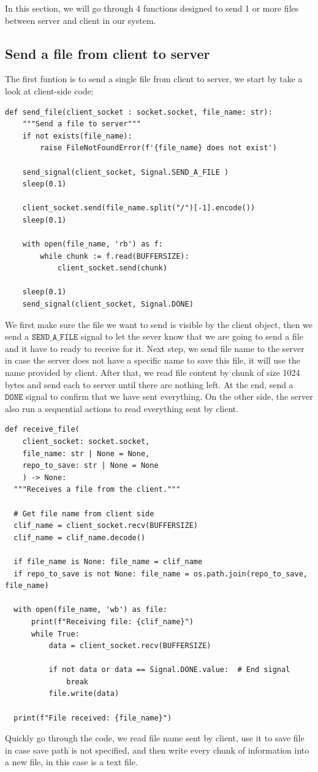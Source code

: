 \documentclass{article}
\begin{document}
In this section, we will go through 4 functions designed to send 1 or more files between server and client in our system. 

\subsection*{Send a file from client to server}
The first funtion is to send a single file from client to server, we start by take a look at client-side code: \pagebreak
\begin{lstlisting}[frame=single]
  def send_file(client_socket : socket.socket, file_name: str):
    """Send a file to server"""
    if not exists(file_name):
        raise FileNotFoundError(f'{file_name} does not exist')
    
    send_signal(client_socket, Signal.SEND_A_FILE )
    sleep(0.1)
    
    client_socket.send(file_name.split("/")[-1].encode())
    sleep(0.1)

    with open(file_name, 'rb') as f:
        while chunk := f.read(BUFFERSIZE):
            client_socket.send(chunk)

    sleep(0.1)
    send_signal(client_socket, Signal.DONE)
\end{lstlisting}
We first make sure the file we want to send is visible by the client object, then we send a $ \texttt{SEND\_A\_FILE} $ signal to let the sever know 
that we are going to send a file and it have to ready to receive for it. Next step, we send file name to the server in case the server does not have 
a specific name to save this file, it will use the name provided by client. After that, we read file content by chunk of size 1024 bytes and send each to
server until there are nothing left. At the end, send a $ \texttt{DONE} $ signal to confirm that we have sent everything. On the other side, the server 
also run a sequential actions to read everything sent by client. 
\begin{lstlisting}[frame=single]
  def receive_file(
    client_socket: socket.socket, 
    file_name: str | None = None, 
    repo_to_save: str | None = None
    ) -> None:
  """Receives a file from the client."""

  # Get file name from client side
  clif_name = client_socket.recv(BUFFERSIZE)
  clif_name = clif_name.decode()

  if file_name is None: file_name = clif_name
  if repo_to_save is not None: file_name = os.path.join(repo_to_save, file_name)

  with open(file_name, 'wb') as file:
      print(f"Receiving file: {clif_name}")
      while True:
          data = client_socket.recv(BUFFERSIZE)

          if not data or data == Signal.DONE.value:  # End signal
              break
          file.write(data)

  print(f"File received: {file_name}")
\end{lstlisting}
Quickly go through the code, we read file name sent by client, use it to save file in case save path is not specified, and then write every chunk of information
into a new file, in this case is a text file.
\end{document}
